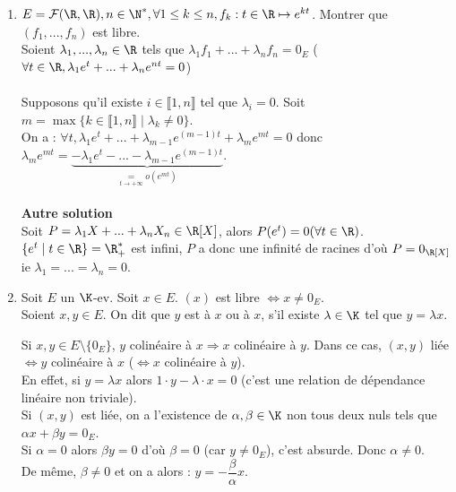 \documentclass[12pt, a4paper]{report}
\begin{document}
\begin{exemple}[Exemples]
\begin{enumerate}
	\item $E = \mathcal{F}(\R,\R), n \in \N^*, \forall 1 \le k \le n, f_k : t \in \R \mapsto e^{kt}$. Montrer que $(f_1,...,f_n)$ est libre. \\
	Soient $\lambda_1,...,\lambda_n \in \R$ tels que $\lambda_1f_1+...+\lambda_nf_n = 0_E$ (\ie $\forall t \in \R, \lambda_1e^t + ...+\lambda_n e^{nt} = 0$) \\ \\
	Supposons qu'il existe $i \in \llbracket 1,n \rrbracket$ tel que $\lambda_i = 0$. Soit $m = \max \{k \in \llbracket 1,n \rrbracket \mid \lambda_k \ne 0 \}$. \\
	On a : $\forall t, \lambda_1 e^t + ... + \lambda_{m-1}e^{(m-1)t} + \lambda_m e^{mt} = 0$ donc \\
	$\lambda_m e^{mt} = \underbrace{- \lambda_1e^t - ... - \lambda_{m-1}e^{(m-1)t}}_{\underset{t \to +\infty}{=} o(e^{mt})}$. \\ \\
	\textbf{Autre solution} \\
	Soit $P = \lambda_1 X + ... + \lambda_n X_n \in \R[X]$, alors $P(e^t) = 0 (\forall t \in \R)$. \\
	$\{e^t \mid t \in \R \} = \R_+^*$ est infini, $P$ a donc une infinité de racines d'où $P = 0_{\R[X]}$ ie $\lambda_1=...=\lambda_n=0$.
	
	\item Soit $E$ un $\K$-ev. Soit $x \in E$. $(x)$ est libre $\Longleftrightarrow x \ne 0_E$. \\
	Soient $x,y \in E$. On dit que $y$ est  à $x$ ou  à $x$, s'il existe $\lambda \in \K$ tel que $y = \lambda x$. \\
	\begin{remarque}{}
	Si $x,y \in E \setminus \{0_E\}$, $y$ colinéaire à $x \Longrightarrow x$ colinéaire à $y$. Dans ce cas, $(x,y)$ liée $\Longleftrightarrow y$ colinéaire à $x$ ($\Longleftrightarrow x$ colinéaire à $y$). \\
	En effet, si $y = \lambda x$ alors $1\cdot y - \lambda \cdot x= 0$ (c'est une relation de dépendance linéaire non triviale). \\
	Si $(x,y)$ est liée, on a l'existence de $\alpha, \beta \in \K$ non tous deux nuls tels que $\alpha x + \beta y = 0_E$. \\
	Si $\alpha = 0$ alors $\beta y = 0$ d'où $\beta = 0$ (car $y \ne 0_E$), c'est absurde. Donc $\alpha \ne 0$. \\
	De même, $\beta \ne 0$ et on a alors : $y = - \dfrac{\beta}{\alpha}x$.
	\end{remarque}
\end{enumerate}
\end{exemple}
\end{document}

